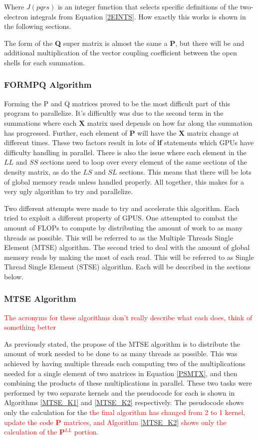 \documentclass[12pt]{report}
\newcommand{\notetodylan}[1]{\textcolor{red}{#1}} %
\begin{document}
Where $J(pqrs)$ is an integer function that selects specific definitions of the two-electron integrals from Equation \ref{2EINTS}. How exactly this works is shown in the following sections.

The form of the \textbf{Q} super matrix is almost the same a \textbf{P}, but there will be and additional multiplication of the vector coupling coefficient between the open shells for each summation.

\subsubsection{FORMPQ Algorithm}
Forming the P and Q matrices proved to be the most difficult part of this program to parallelize. It's difficultly was due to the second term in the summations where each \textbf{X} matrix used depends on how far along the summation has progressed. Further, each element of \textbf{P} will have the \textbf{X} matrix change at different times. These two factors result in lots of \textbf{if} statements which GPUs have difficulty handling in parallel. There is also the issue where each element in the $LL$ and $SS$ sections need to loop over every element of the same sections of the density matrix, as do the $LS$ and $SL$ sections. This means that there will be lots of global memory reads unless handled properly. All together, this makes for a very ugly algorithm to try and parallelize.

Two different attempts were made to try and accelerate this algorithm. Each tried to exploit a different property of GPUS. One attempted to combat the amount of FLOPs to compute by distributing the amount of work to as many threads as possible. This will be referred to as the Multiple Threads Single Element (MTSE) algorithm. The second tried to deal with the amount of global memory reads by making the most of each read. This will be referred to as Single Thread Single Element (STSE) algorithm. Each will be described in the sections below.

\subsubsection{MTSE Algorithm}
\notetodylan{The acronyms for these algorithms don't really describe what each does, think of something better}

As previously stated, the propose of the MTSE algorithm is to distribute the amount of work needed to be done to as many threads as possible. This was achieved by having multiple threads each computing two of the multiplications needed for a single element of two matrices in Equation \ref{PSMTX}, and then combining the products of these multiplications in parallel. These two tasks were performed by two separate kernels and the pseudocode for each is shown in Algorithms \ref{MTSE_K1} and \ref{MTSE_K2} respectively. The pseudocode shows only the calculation for the \notetodylan{the final algorithm has changed from 2 to 1 kernel, update the code  \textbf{P} matrices, and Algorithm \ref{MTSE_K2} shows only the calculation of the \textbf{P$^{LL}$} portion.} 
\end{document}
